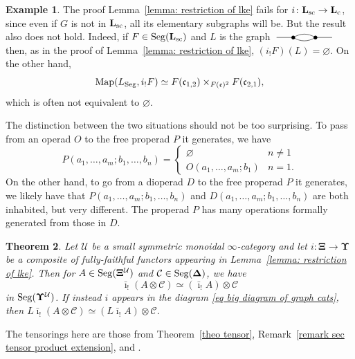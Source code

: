 \documentclass{amsart}
\newtheorem{theorem}{Theorem}
\numberwithin{theorem}{subsection}
\theoremstyle{definition}
\newtheorem{example}[theorem]{Example}
\newcommand{\Map}{\operatorname{Map}}
\newcommand{\xcc}{\mathcal{C}}
\newcommand{\xU}{\mathcal{U}}
\newcommand{\xfe}{\mathfrak{e}}
\newcommand{\xfc}{\mathfrak{c}}
\newcommand{\name}[1]{\ensuremath{\text{\textup{#1}}}}
\newcommand{\simp}{\mathbf{\Delta}}
\newcommand{\levelg}{\mathbf{L}}
\newcommand{\levelgconn}{\levelg_{\name{c}}}
\newcommand{\gc}{\mathbf{\Xi}}
\newcommand{\gcone}{\gc}
\newcommand{\gctwo}{\mathbf{\Upsilon}}
\newcommand{\gcUone}{\gcone^\xU}
\newcommand{\gcUtwo}{\gctwo^\xU}
\newcommand{\barishriek}{\bar \imath_!}
\newcommand{\Seg}{\name{Seg}}
\begin{document}
\begin{example}\label{example: failure of lke restriction}
The proof Lemma~\ref{lemma: restriction of lke} fails for $i \colon \levelg_{\name{sc}} \to \levelgconn$, since even if $G$ is not in $\levelg_{\name{sc}}$, all its elementary subgraphs will be.
But the result also does not hold. 
Indeed, if $F\in \Seg(\levelg_{\name{sc}})$ and $L$ is the graph 
$\begin{tikzcd}[cramped, sep=small]
{} \rar[no head, end anchor=center] & \bullet \rar[bend left=30, no head, start anchor=center, end anchor=center] \rar[bend right=30, no head, start anchor=center, end anchor=center] & \bullet \rar[no head, start anchor=center] & {}
\end{tikzcd}$
then, as in the proof of Lemma~\ref{lemma: restriction of lke}, $(i_!F)(L) = \varnothing$.
On the other hand, \[ \Map(L_{\Seg},i_!F) \simeq F(\xfc_{1,2}) \times_{F(\xfe)^2} F(\xfc_{2,1}), \]
which is often not equivalent to $\varnothing$.
\end{example}

The distinction between the two situations should not be too surprising.
To pass from an operad $O$ to the free properad $P$ it generates, we have
\[
	P(a_1, \dots, a_m; b_1, \dots, b_n) = \begin{cases}
		\varnothing & n \neq 1 \\
		O(a_1, \dots, a_m; b_1) & n=1.
	\end{cases}
\]
On the other hand, to go from a dioperad $D$ to the free properad $P$ it generates, we likely have that $P(a_1, \dots, a_m; b_1, \dots, b_n)$ and $D(a_1, \dots, a_m; b_1, \dots, b_n)$ are both inhabited, but very different.
The properad $P$ has many operations formally generated from those in $D$.

\begin{theorem}\label{thm generic compatibility with tensor}
Let $\xU$ be a small symmetric monoidal $\infty$-category and let $i \colon \gcone \to \gctwo$ be a composite of fully-faithful functors appearing in Lemma~\ref{lemma: restriction of lke}.
Then for $A \in \Seg(\gcUone)$ and $\xcc \in \Seg(\simp)$, we have
\[
	\barishriek (A \otimes \xcc) \simeq (\barishriek A) \otimes \xcc
\]
in $\Seg(\gcUtwo)$.
If instead $i$ appears in the diagram \eqref{eq big diagram of graph cats}, then $L\barishriek (A \otimes \xcc) \simeq (L\barishriek A) \otimes \xcc$.
\end{theorem}
The tensorings here are those from Theorem~\ref{theo tensor}, Remark~\ref{remark sec tensor product extension}, and \cite{ChuHaugseng}.
\end{document}
